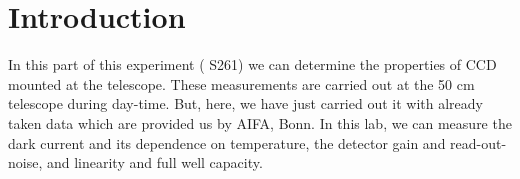 \section{Introduction}
In this part of this experiment ( S261) we can determine the properties of CCD mounted at the telescope. These measurements are carried out at the 50 cm telescope during day-time. But, here, we have just carried out it with already taken data which are provided us by AIFA, Bonn. In this lab, we can measure the dark current and its dependence on temperature, the detector gain and read-out-noise, and linearity and full well capacity.